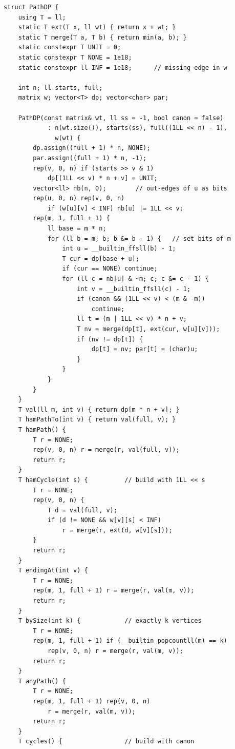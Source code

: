 \begin{lstlisting}
struct PathDP {
    using T = ll;
    static T ext(T x, ll wt) { return x + wt; }
    static T merge(T a, T b) { return min(a, b); }
    static constexpr T UNIT = 0;
    static constexpr T NONE = 1e18;
    static constexpr ll INF = 1e18;      // missing edge in w

    int n; ll starts, full;
    matrix w; vector<T> dp; vector<char> par;

    PathDP(const matrix& wt, ll ss = -1, bool canon = false)
            : n(wt.size()), starts(ss), full((1LL << n) - 1),
              w(wt) {
        dp.assign((full + 1) * n, NONE);
        par.assign((full + 1) * n, -1);
        rep(v, 0, n) if (starts >> v & 1)
            dp[(1LL << v) * n + v] = UNIT;
        vector<ll> nb(n, 0);        // out-edges of u as bits
        rep(u, 0, n) rep(v, 0, n)
            if (w[u][v] < INF) nb[u] |= 1LL << v;
        rep(m, 1, full + 1) {
            ll base = m * n;
            for (ll b = m; b; b &= b - 1) {   // set bits of m
                int u = __builtin_ffsll(b) - 1;
                T cur = dp[base + u];
                if (cur == NONE) continue;
                for (ll c = nb[u] & ~m; c; c &= c - 1) {
                    int v = __builtin_ffsll(c) - 1;
                    if (canon && (1LL << v) < (m & -m))
                        continue;
                    ll t = (m | 1LL << v) * n + v;
                    T nv = merge(dp[t], ext(cur, w[u][v]));
                    if (nv != dp[t]) {
                        dp[t] = nv; par[t] = (char)u;
                    }
                }
            }
        }
    }
    T val(ll m, int v) { return dp[m * n + v]; }
    T hamPathTo(int v) { return val(full, v); }
    T hamPath() {
        T r = NONE;
        rep(v, 0, n) r = merge(r, val(full, v));
        return r;
    }
    T hamCycle(int s) {          // build with 1LL << s
        T r = NONE;
        rep(v, 0, n) {
            T d = val(full, v);
            if (d != NONE && w[v][s] < INF)
                r = merge(r, ext(d, w[v][s]));
        }
        return r;
    }
    T endingAt(int v) {
        T r = NONE;
        rep(m, 1, full + 1) r = merge(r, val(m, v));
        return r;
    }
    T bySize(int k) {            // exactly k vertices
        T r = NONE;
        rep(m, 1, full + 1) if (__builtin_popcountll(m) == k)
            rep(v, 0, n) r = merge(r, val(m, v));
        return r;
    }
    T anyPath() {
        T r = NONE;
        rep(m, 1, full + 1) rep(v, 0, n)
            r = merge(r, val(m, v));
        return r;
    }
    T cycles() {                 // build with canon

\end{lstlisting}
